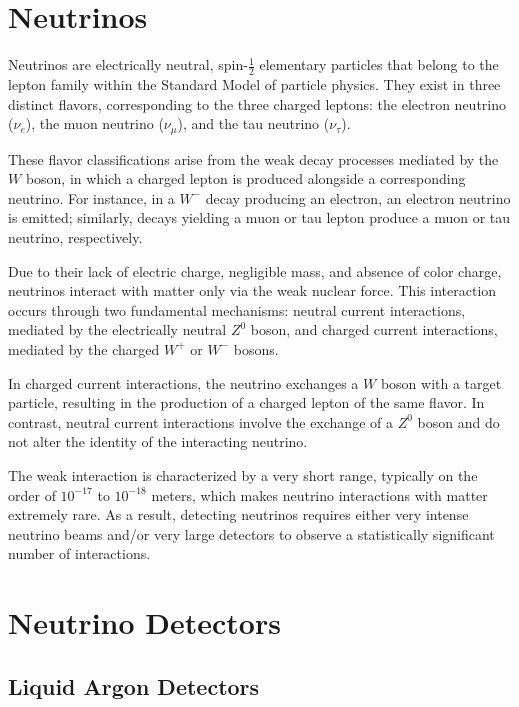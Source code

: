 \documentclass{pracalicmgr}
\begin{document}
\section{Neutrinos}

Neutrinos are electrically neutral, spin-$\frac{1}{2}$ elementary particles that belong to the lepton family within the Standard Model of particle physics. They exist in three distinct flavors, corresponding to the three charged leptons: the electron neutrino ($\nu_e$), the muon neutrino ($\nu_\mu$), and the tau neutrino ($\nu_\tau$).

These flavor classifications arise from the weak decay processes mediated by the $W$ boson, in which a charged lepton is produced alongside a corresponding neutrino. For instance, in a $W^-$ decay producing an electron, an electron neutrino is emitted; similarly, decays yielding a muon or tau lepton produce a muon or tau neutrino, respectively.

Due to their lack of electric charge, negligible mass, and absence of color charge, neutrinos interact with matter only via the weak nuclear force. This interaction occurs through two fundamental mechanisms: neutral current interactions, mediated by the electrically neutral $Z^0$ boson, and charged current interactions, mediated by the charged $W^+$ or $W^-$ bosons.

In charged current interactions, the neutrino exchanges a $W$ boson with a target particle, resulting in the production of a charged lepton of the same flavor. In contrast, neutral current interactions involve the exchange of a $Z^0$ boson and do not alter the identity of the interacting neutrino.

The weak interaction is characterized by a very short range, typically on the order of $10^{-17}$ to $10^{-18}$ meters, which makes neutrino interactions with matter extremely rare. As a result, detecting neutrinos requires either very intense neutrino beams and/or very large detectors to observe a statistically significant number of interactions.


\section{Neutrino Detectors}

\subsection{Liquid Argon Detectors}
\end{document}
